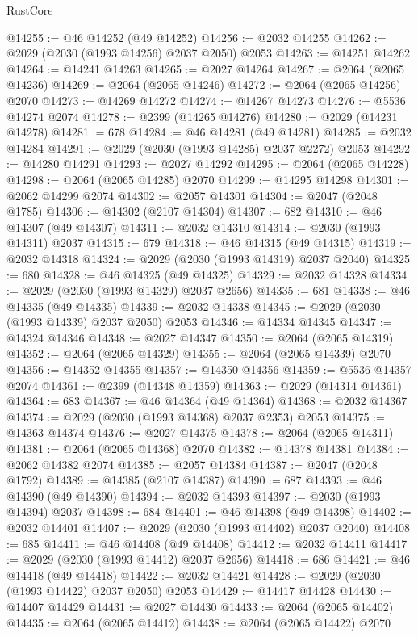 \begin{lexlean}{RustCore}
\begin{coremodule}
@14255 := @46 @14252 (@49 @14252)
@14256 := @2032 @14255
@14262 := @2029 (@2030 (@1993 @14256) @2037 @2050) @2053
@14263 := @14251 @14262
@14264 := @14241 @14263
@14265 := @2027 @14264
@14267 := @2064 (@2065 @14236)
@14269 := @2064 (@2065 @14246)
@14272 := @2064 (@2065 @14256) @2070
@14273 := @14269 @14272
@14274 := @14267 @14273
@14276 := @5536 @14274 @2074
@14278 := @2399 (@14265 @14276)
@14280 := @2029 (@14231 @14278)
@14281 := 678
@14284 := @46 @14281 (@49 @14281)
@14285 := @2032 @14284
@14291 := @2029 (@2030 (@1993 @14285) @2037 @2272) @2053
@14292 := @14280 @14291
@14293 := @2027 @14292
@14295 := @2064 (@2065 @14228)
@14298 := @2064 (@2065 @14285) @2070
@14299 := @14295 @14298
@14301 := @2062 @14299 @2074
@14302 := @2057 @14301
@14304 := @2047 (@2048 @1785)
@14306 := @14302 (@2107 @14304)
@14307 := 682
@14310 := @46 @14307 (@49 @14307)
@14311 := @2032 @14310
@14314 := @2030 (@1993 @14311) @2037
@14315 := 679
@14318 := @46 @14315 (@49 @14315)
@14319 := @2032 @14318
@14324 := @2029 (@2030 (@1993 @14319) @2037 @2040)
@14325 := 680
@14328 := @46 @14325 (@49 @14325)
@14329 := @2032 @14328
@14334 := @2029 (@2030 (@1993 @14329) @2037 @2656)
@14335 := 681
@14338 := @46 @14335 (@49 @14335)
@14339 := @2032 @14338
@14345 := @2029 (@2030 (@1993 @14339) @2037 @2050) @2053
@14346 := @14334 @14345
@14347 := @14324 @14346
@14348 := @2027 @14347
@14350 := @2064 (@2065 @14319)
@14352 := @2064 (@2065 @14329)
@14355 := @2064 (@2065 @14339) @2070
@14356 := @14352 @14355
@14357 := @14350 @14356
@14359 := @5536 @14357 @2074
@14361 := @2399 (@14348 @14359)
@14363 := @2029 (@14314 @14361)
@14364 := 683
@14367 := @46 @14364 (@49 @14364)
@14368 := @2032 @14367
@14374 := @2029 (@2030 (@1993 @14368) @2037 @2353) @2053
@14375 := @14363 @14374
@14376 := @2027 @14375
@14378 := @2064 (@2065 @14311)
@14381 := @2064 (@2065 @14368) @2070
@14382 := @14378 @14381
@14384 := @2062 @14382 @2074
@14385 := @2057 @14384
@14387 := @2047 (@2048 @1792)
@14389 := @14385 (@2107 @14387)
@14390 := 687
@14393 := @46 @14390 (@49 @14390)
@14394 := @2032 @14393
@14397 := @2030 (@1993 @14394) @2037
@14398 := 684
@14401 := @46 @14398 (@49 @14398)
@14402 := @2032 @14401
@14407 := @2029 (@2030 (@1993 @14402) @2037 @2040)
@14408 := 685
@14411 := @46 @14408 (@49 @14408)
@14412 := @2032 @14411
@14417 := @2029 (@2030 (@1993 @14412) @2037 @2656)
@14418 := 686
@14421 := @46 @14418 (@49 @14418)
@14422 := @2032 @14421
@14428 := @2029 (@2030 (@1993 @14422) @2037 @2050) @2053
@14429 := @14417 @14428
@14430 := @14407 @14429
@14431 := @2027 @14430
@14433 := @2064 (@2065 @14402)
@14435 := @2064 (@2065 @14412)
@14438 := @2064 (@2065 @14422) @2070

\end{coremodule}
\end{lexlean}
